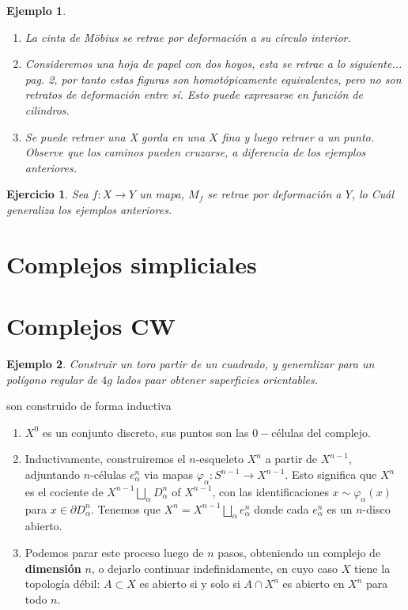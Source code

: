 \documentclass[12pt]{book}
\newtheorem{eje}{Ejemplo}
\newtheorem{ex}{Ejercicio}
\begin{document}
\begin{eje}
\begin{enumerate}
\item La cinta de Möbius se retrae por deformación a su círculo interior. 
\item Consideremos una hoja de papel con dos hoyos, esta se retrae a lo siguiente... pag. 2, por tanto estas figuras son homotópicamente equivalentes, pero no son retratos de deformación entre sí. \textit{Esto puede expresarse en función de cilindros}.
\item Se puede retraer una X gorda en una $X$ fina y luego retraer a un punto. Observe que los caminos pueden cruzarse, a diferencia de los ejemplos anteriores. 
\end{enumerate}
\end{eje}

\begin{ex}
Sea $f: X \rightarrow Y$ un mapa, $M_f$ se retrae por deformación a $Y$, lo Cuál generaliza los ejemplos anteriores. 
\end{ex}


\section{Complejos simpliciales }


\section{Complejos CW}

\begin{eje}
Construir un toro partir de un cuadrado, y generalizar para un polígono regular de $4g$ lados paar obtener superficies orientables.
\end{eje}


son construido de forma inductiva
\begin{enumerate}
\item $X^0$ es un conjunto discreto, sus puntos son las $0-$células del complejo.
\item Inductivamente, construiremos el $n$-esqueleto $X^n$ a partir de $X^{n-1}$, adjuntando $n$-células $e_\alpha^n$ via mapas $\varphi_\alpha: S^{n-1} \rightarrow X^{n-1}$. Esto significa que $X^n$ es el cociente de $X^{n-1} \bigsqcup_\alpha D_\alpha^n$ of $X^{n-1}$, con las identificaciones $x \sim \varphi_\alpha(x)$ para $x \in \partial D_\alpha^n$. Tenemos que $X^n=X^{n-1} \bigsqcup_\alpha e_\alpha^n$ donde cada $e_\alpha^n$ es un $n$-disco abierto.
\item Podemos parar este proceso luego de $n$ pasos, obteniendo un complejo de \textbf{dimensión} $n$, o dejarlo continuar indefinidamente, en cuyo caso $X$ tiene la topología débil: $A \subset X$ es abierto si y solo si $A \cap X^n$ es abierto en $X^n$ para todo $n$.
\end{enumerate}
\end{document}
